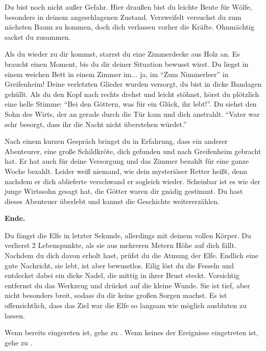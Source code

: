 Du bist noch nicht außer Gefahr. Hier draußen bist du leichte Beute für Wölfe, besonders in deinem angeschlagenen Zustand. Verzweifelt versuchst du zum nächsten Baum zu kommen, doch dich verlassen vorher die Kräfte. Ohnmächtig sackst du zusammen.

Als du wieder zu dir kommst, starrst du eine Zimmerdecke aus Holz an. Es braucht einen Moment, bis du dir deiner Situation bewusst wirst. Du liegst in einem weichen Bett in einem Zimmer im... ja, im ``Zum Nimmerleer'' in Greifenheim! Deine verletzten Glieder wurden versorgt, du bist in dicke Bandagen gehüllt. Als du den Kopf nach rechts drehst und leicht stöhnst, hörst du plötzlich eine helle Stimme: ``Bei den Göttern, was für ein Glück, ihr lebt!''. Du siehst den Sohn des Wirts, der an gerade durch die Tür kam und dich anstrahlt. ``Vater war sehr besorgt, dass ihr die Nacht nicht überstehen würdet.''

Nach einem kurzen Gespräch bringst du in Erfahrung, dass ein anderer Abenteurer, eine große Schildkröte, dich gefunden und nach Greifenheim gebracht hat. Er hat auch für deine Versorgung und das Zimmer bezahlt für eine ganze Woche bezahlt. Leider weiß niemand, wie dein mysteriöser Retter heißt, denn nachdem er dich ablieferte verschwand er sogleich wieder. Scheinbar ist es wie der junge Wirtssohn gesagt hat, die Götter waren dir gnädig gestimmt. Du hast dieses Abenteuer überlebt und kannst die Geschichte weitererzählen.

\textbf{Ende.}


Du fängst die Elfe in letzter Sekunde, allerdings mit deinem vollen Körper. Du verlierst 2 Lebenspunkte, als sie aus mehreren Metern Höhe auf dich fällt. Nachdem du dich davon erholt hast, prüfst du die Atmung der Elfe. Endlich eine gute Nachricht, sie lebt, ist aber bewusstlos. Eilig löst du die Fesseln und entdeckst dabei ein dicke Nadel, die mittig in ihrer Brust steckt. Vorsichtig entfernst du das Werkzeug  und drückst auf die kleine Wunde. Sie ist tief, aber nicht besonders breit, sodass du dir keine großen Sorgen machst. Es ist offensichtlich, dass das Ziel war die Elfe so langsam wie möglich ausbluten zu lassen.

Wenn  bereits eingereten ist, gehe zu . Wenn keines der Ereignisse eingetreten ist, gehe zu .


